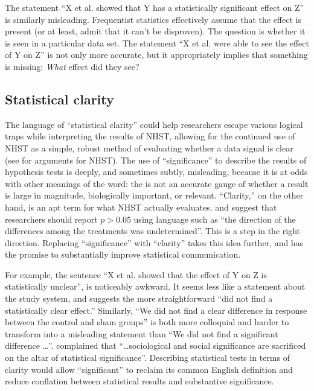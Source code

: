 The statement ``X et al. showed that Y has a statistically significant effect on Z'' is similarly misleading. Frequentist statistics effectively assume that the effect is present (or at least, admit that it can't be disproven). The question is whether it is seen in a particular data set. The statement ``X et al. were able to see the effect of Y on Z'' is not only more accurate, but it appropriately implies that something is missing: \emph{What} effect did they see?

\subsection*{Statistical clarity}

\noindent The language of ``statistical clarity'' could help researchers escape various logical traps while interpreting the results of NHST, allowing for the continued use of NHST as a simple, robust method of evaluating whether a data signal is clear (see \cite{Abelson1997} for arguments for NHST). The use of ``significance'' to describe the results of hypothesis tests is deeply, and sometimes subtly, misleading, because it is at odds with other meanings of the word: the \pval is not an accurate gauge of whether a result is large in magnitude, biologically important, or relevant. ``Clarity,'' on the other hand, is an apt term for what NHST actually evaluates. \citet{jones2000sensible} and \citet{robinson2001past} suggest that researchers should report $p > 0.05$ using language such as ``the direction of the differences among the treatments was undetermined''. This is a step in the right direction. Replacing ``significance'' with ``clarity'' takes this idea further, and has the promise to substantially improve statistical communication.

For example, the sentence ``X et al. showed that the effect of Y on Z is statistically unclear'', is noticeably awkward. It seems less like a statement about the study system, and suggests the more straightforward ``did not find a statistically clear effect.'' Similarly, ``We did not find a clear difference in response between the control and sham groups'' is both more colloquial and harder to transform into a misleading statement than ``We did not find a significant difference \ldots''. \citet{Bernardietal.2017} complained that ``\ldots sociological and social significance are sacrificed on the altar of statistical significance''. Describing statistical tests in terms of clarity would allow ``significant'' to reclaim its common English definition and reduce conflation between statistical results and substantive significance.

